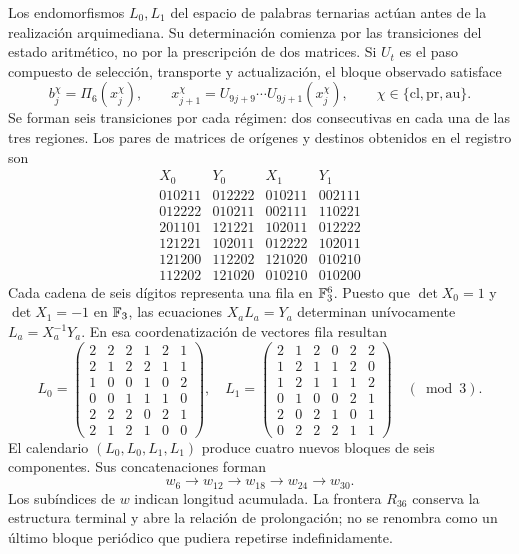 Los endomorfismos \(L_0,L_1\) del espacio de palabras ternarias actúan antes de la realización arquimediana. Su determinación comienza por las transiciones del estado aritmético, no por la prescripción de dos matrices. Si \(U_t\) es el paso compuesto de selección, transporte y actualización, el bloque observado satisface
\[
 b_j^\chi=\Pi_6(x_j^\chi),\qquad
 x_{j+1}^\chi=U_{9j+9}\cdots U_{9j+1}(x_j^\chi),
 \qquad \chi\in\{\mathrm{cl},\mathrm{pr},\mathrm{au}\}.
\]
Se forman seis transiciones por cada régimen: dos consecutivas en cada una de las tres regiones. Los pares de matrices de orígenes y destinos obtenidos en el registro son
\[
\begin{array}{c|c|c|c}
X_0&Y_0&X_1&Y_1\\\hline
010211&012222&010211&002111\\
012222&010211&002111&110221\\
201101&121221&102011&012222\\
121221&102011&012222&102011\\
121200&112202&121020&010210\\
112202&121020&010210&010200
\end{array}
\]
Cada cadena de seis dígitos representa una fila en \(\mathbb F_3^6\). Puesto que \(\det X_0=1\) y \(\det X_1=-1\) en \(\mathbb F_3\), las ecuaciones \(X_aL_a=Y_a\) determinan unívocamente \(L_a=X_a^{-1}Y_a\). En esa coordenatización de vectores fila resultan
\[
 L_0=\begin{pmatrix}
 2&2&2&1&2&1\\2&1&2&2&1&1\\1&0&0&1&0&2\\
 0&0&1&1&1&0\\2&2&2&0&2&1\\2&1&2&1&0&0
 \end{pmatrix},\quad
 L_1=\begin{pmatrix}
 2&1&2&0&2&2\\1&2&1&1&2&0\\1&2&1&1&1&2\\
 0&1&0&0&2&1\\2&0&2&1&0&1\\0&2&2&2&1&1
 \end{pmatrix}\quad(\bmod3).
\]
El calendario \((L_0,L_0,L_1,L_1)\) produce cuatro nuevos bloques de seis componentes. Sus concatenaciones forman
\[
 w_6\longrightarrow w_{12}\longrightarrow w_{18}
 \longrightarrow w_{24}\longrightarrow w_{30}.
\]
Los subíndices de \(w\) indican longitud acumulada. La frontera \(R_{36}\) conserva la estructura terminal y abre la relación de prolongación; no se renombra como un último bloque periódico que pudiera repetirse indefinidamente.

